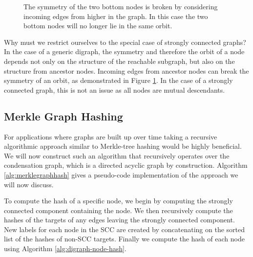 \documentclass{svproc}
\begin{document}
\begin{figure}[t]  
\centering 
{}
\caption{The symmetry of the two bottom nodes is broken by considering incoming edges from higher in the graph. In this case the two bottom nodes will no longer lie in the same orbit.}
\label{fig:breaksymmetry}
\end{figure}

Why must we restrict ourselves to the special case of strongly connected graphs? In the case of a generic digraph, the symmetry and therefore the orbit of a node depends not only on the structure of the reachable subgraph, but also on the structure from ancestor nodes. Incoming edges from ancestor nodes can break the symmetry of an orbit, as demonstrated in Figure \ref{fig:breaksymmetry}. In the case of a strongly connected graph, this is not an issue as all nodes are mutual descendants.

\subsection{Merkle Graph Hashing}\label{sec:merkle-graph-hashing}

For applications where graphs are built up over time taking a recursive algorithmic approach similar to Merkle-tree hashing would be highly beneficial. We will now construct such an algorithm that recursively operates over the condensation graph, which is a directed acyclic graph by construction. Algorithm \ref{alg:merklegraphhash} gives a pseudo-code implementation of the approach we will now discuss.

To compute the hash of a specific node, we begin by computing the strongly connected component containing the node. We then recursively compute the hashes of the targets of any edges leaving the strongly connected component. New labels for each node in the SCC are created by concatenating on the sorted list of the hashes of non-SCC targets. Finally we compute the hash of each node using Algorithm \ref{alg:digraph-node-hash}.
\end{document}
